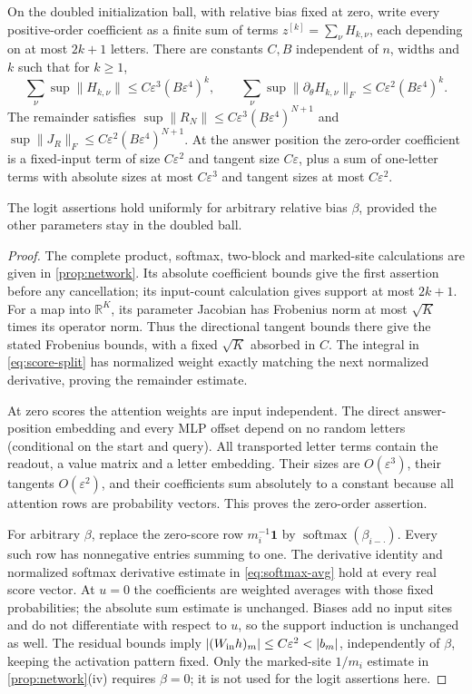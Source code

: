 \begin{lemma}\label{lem:direct-support}
On the doubled initialization ball, with relative bias fixed at zero, write every positive-order coefficient as a finite sum of terms $z^{[k]}=\sum_\nu H_{k,\nu}$, each depending on at most $2k+1$ letters. There are constants $C,B$ independent of $n$, widths and $k$ such that for $k\ge1$,
\[
 \sum_\nu\sup\|H_{k,\nu}\|\le C\varepsilon^3(B\varepsilon^4)^k,\qquad
 \sum_\nu\sup\|\partial_\theta H_{k,\nu}\|_F\le C\varepsilon^2(B\varepsilon^4)^k.
\]
The remainder satisfies $\sup\|R_N\|\le C\varepsilon^3(B\varepsilon^4)^{N+1}$ and $\sup\|J_R\|_F\le C\varepsilon^2(B\varepsilon^4)^{N+1}$. At the answer position the zero-order coefficient is a fixed-input term of size $C\varepsilon^2$ and tangent size $C\varepsilon$, plus a sum of one-letter terms with absolute sizes at most $C\varepsilon^3$ and tangent sizes at most $C\varepsilon^2$.

The logit assertions hold uniformly for arbitrary relative bias $\beta$, provided the other parameters stay in the doubled ball.
\end{lemma}
\begin{proof}
The complete product, softmax, two-block and marked-site calculations are given in \cref{prop:network}. Its absolute coefficient bounds give the first assertion before any cancellation; its input-count calculation gives support at most $2k+1$. For a map into $\mathbb R^K$, its parameter Jacobian has Frobenius norm at most $\sqrt K$ times its operator norm. Thus the directional tangent bounds there give the stated Frobenius bounds, with a fixed $\sqrt K$ absorbed in $C$. The integral in \eqref{eq:score-split} has normalized weight exactly matching the next normalized derivative, proving the remainder estimate.

At zero scores the attention weights are input independent. The direct answer-position embedding and every MLP offset depend on no random letters (conditional on the start and query). All transported letter terms contain the readout, a value matrix and a letter embedding. Their sizes are $O(\varepsilon^3)$, their tangents $O(\varepsilon^2)$, and their coefficients sum absolutely to a constant because all attention rows are probability vectors. This proves the zero-order assertion.

For arbitrary $\beta$, replace the zero-score row $m_i^{-1}\bm1$ by $\operatorname{softmax}(\beta_{i-\cdot})$. Every such row has nonnegative entries summing to one. The derivative identity and normalized softmax derivative estimate in \eqref{eq:softmax-avg} hold at every real score vector. At $u=0$ the coefficients are weighted averages with those fixed probabilities; the absolute sum estimate is unchanged. Biases add no input sites and do not differentiate with respect to $u$, so the support induction is unchanged as well. The residual bounds imply $|(W_{\rm in}h)_m|\le C\varepsilon^2<|b_m|$, independently of $\beta$, keeping the activation pattern fixed. Only the marked-site $1/m_i$ estimate in \cref{prop:network}(iv) requires $\beta=0$; it is not used for the logit assertions here.
\end{proof}

